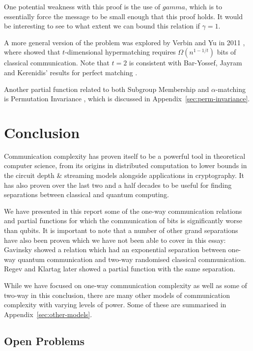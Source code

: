 \documentclass[a4paper]{article}
\begin{document}
        One potential weakness with this proof is the use of $gamma$, which is to essentially force the message to be small enough that this proof holds. It would be interesting to see to what extent we can bound this relation if $\gamma = 1$.

        A more general version of the problem was explored by Verbin and Yu in 2011 \cite{Verbin:2011:SCC:2133036.2133038}, where showed that $t$-dimensional hypermatching requires $\Omega(n^{1-1/t})$ bits of classical communication. Note that $t=2$ is consistent with Bar-Yossef, Jayram and Kerenidis' results for perfect matching \cite{doi:10.1137/060651835}.

        Another partial function related to both Subgroup Membership and $\alpha$-matching is Permutation Invariance \cite{Montanaro:2011:NES:2230916.2230919}, which is discussed in Appendix~\ref{sec:perm-invariance}.

    \section{Conclusion}
    \label{sec:conclusion}

        Communication complexity has proven itself to be a powerful tool in theoretical computer science, from its origins in distributed computation to lower bounds in the circuit depth \& streaming models alongside applications in cryptography. It has also proven over the last two and a half decades to be useful for finding separations between classical and quantum computing.

        We have presented in this report some of the one-way communication relations and partial functions for which the communication of bits is significantly worse than qubits. It is important to note that a number of other grand separations have also been proven which we have not been able to cover in this essay: Gavinsky \cite{gavinsky2008classical} showed a relation which had an exponential separation between one-way quantum communication and two-way randomised classical communication. Regev and Klartag \cite{Regev:2011:QOC:1993636.1993642} later showed a partial function with the same separation.

        While we have focused on one-way communication complexity as well as some of two-way in this conclusion, there are many other models of communication complexity with varying levels of power. Some of these are summarised in Appendix~\ref{sec:other-models}.

        \subsection{Open Problems}
\end{document}
